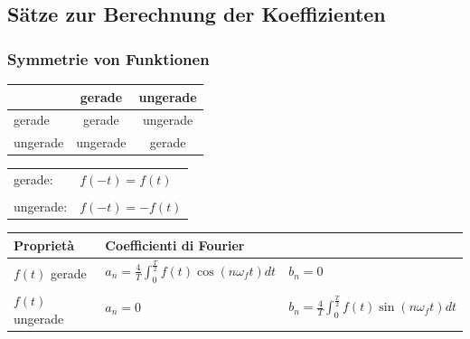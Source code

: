\subsection{Sätze zur Berechnung der Koeffizienten}

\subsubsection{Symmetrie von Funktionen}

\begin{minipage}{0.48\linewidth}
    \begin{tabular}{l | c | c}
                    & gerade    & ungerade  \\ 
        \hline
        gerade      & gerade    & ungerade  \\
        \hline
        ungerade    & ungerade  & gerade    \\
    \end{tabular}
\end{minipage}
\hfill
\begin{minipage}{0.43\linewidth}
    \begin{tabular}{ll}
        gerade:     &  $f(-t) = f(t)$ \\
        \\ 
        ungerade:   & $f(-t) = - f(t)$ 
    \end{tabular}
\end{minipage}

\smallskip
\renewcommand{\arraystretch}{2.2}
\begin{tabular}{l|l|l}
\textbf{Proprietà} & \multicolumn{2}{l}{\textbf{Coefficienti di Fourier}} \\ \hline
\multirow{2}{*}{$f(t)$ gerade}   & $\displaystyle a_n = \frac{4}{T} \int_{0}^{\frac{T}{2}} f(t) \cos(n \omega_f t) dt$ & $b_n = 0$ \\
                                 & \color{blue}{$\text{Im}(c_k) = 0$} & \color{blue}{$c_n = \frac{a_n}{2}$ (reell)} \\ \hline
\multirow{2}{*}{$f(t)$ ungerade} & $\displaystyle a_n = 0$ & $\displaystyle b_n = \frac{4}{T} \int_{0}^{\frac{T}{2}} f(t) \sin(n \omega_f t) dt$ \\
                                 & \color{blue}{$\text{Re}(c_k) = 0$} \qquad \color{blue}{$c_0 = 0$} & \color{blue}{$c_n = -j \frac{b_n}{2}$ (imaginär)} \\ \hline
\end{tabular}
\renewcommand{\arraystretch}{1}

